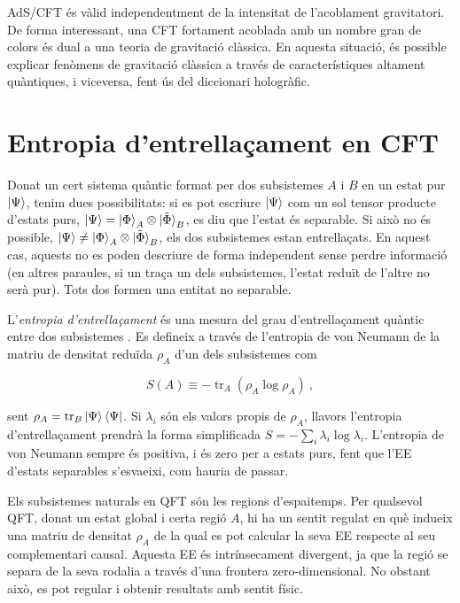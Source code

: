 \documentclass[twocolumn]{revtex4}
\providecommand{\eq}[2]{
    \begin{equation}
        #2
    \label{eq:#1}
    \end{equation}
}
\DeclareMathOperator{\tr}{tr}
\begin{document}
AdS/CFT és vàlid independentment de la intensitat de l'acoblament gravitatori. De forma interessant, una CFT fortament acoblada amb un nombre gran de colors és dual a una teoria de gravitació clàssica.
En aquesta situació, és possible explicar fenòmens de gravitació clàssica a través de característiques altament quàntiques, i viceversa, fent ús del diccionari hologràfic.


\section{Entropia d'entrellaçament en CFT} \label{s:EE_CFT}

Donat un cert sistema quàntic format per dos subsistemes $A$ i $B$ en un estat pur $\ket{\Psi}$, tenim dues possibilitats: si es pot escriure $\ket{\Psi}$ com un sol tensor producte d'estats purs, $\ket{\Psi} = \ket{\Phi}_A \otimes \ket{\tilde{\Phi}}_B$, es diu que l'estat és separable. Si això no és possible, $\ket{\Psi} \neq \ket{\Phi}_A \otimes \ket{\tilde{\Phi}}_B$, els dos subsistemes estan entrellaçats.
En aquest cas, aquests no es poden descriure de forma independent sense perdre informació (en altres paraules, si un traça un dels subsistemes, l'estat reduït de l'altre no serà pur). Tots dos formen una entitat no separable.

L'\emph{entropia d'entrellaçament} és una mesura del grau d'entrellaçament quàntic entre dos subsistemes \cite{nishioka_entanglement_2018}. Es defineix a través de l'entropia de von Neumann de la matriu de densitat reduïda $\rho_A$ d'un dels subsistemes com
\eq{EE}{
S(A) \equiv - \tr_A ( \rho_A \log \rho_A ) \ ,
}
sent $\rho_A = \tr_B \ket{\Psi}\bra{\Psi}$. Si $\lambda_i$ són els valors propis de $\rho_A$, llavors l'entropia d'entrellaçament prendrà la forma simplificada $S = - \sum_i \lambda_i \log \lambda_i$. L'entropia de von Neumann sempre és positiva, i és zero per a estats purs, fent que l'EE d'estats separables s'esvaeixi, com hauria de passar.

Els subsistemes naturals en QFT són les regions d'espaitemps. Per qualsevol QFT, donat un estat global i certa regió $A$, hi ha un sentit regulat en què indueix una matriu de densitat $\rho_A$ de la qual es pot calcular la seva EE respecte al seu complementari causal.
Aquesta EE és intrínsecament divergent, ja que la regió se separa de la seva rodalia a través d'una frontera zero-dimensional. No obstant això, es pot regular i obtenir resultats amb sentit físic.
\end{document}
